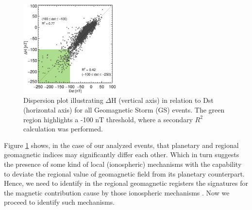 \documentclass[a4paper,fleqn]{cas-dc}
\begin{document}
\begin{figure}
    \centering
     \includegraphics[width=0.45\textwidth]{images/disp_dst_v_dh/dispersion_general_dst.eps}
      \caption{Dispersion plot illustrating $\Delta$H (vertical axis) in relation to Dst (horizontal axis) for all Geomagnetic Storm (GS) events. The green region highlights a -100 nT threshold, where a secondary $R^2$ calculation was performed.}
       \label{fig:disp}
\end{figure}


Figure \ref{fig:disp} shows, in the case of our analyzed events, that planetary and regional geomagnetic indices may significantly differ each other. Which in turn suggests the presence of some kind of local (ionospheric) mechanisms with the capability to deviate the regional value of geomagnetic field from its planetary counterpart. Hence, we need to identify in the regional geomagnetic registers the signatures for the magnetic contribution cause by those ionospheric mechanisms \citep{ddyn2005, angeoddyn, amorymazaudier_2017, amory2020_filtros}. Now we proceed to identify such mechanisms.






\end{document}

